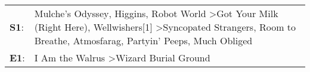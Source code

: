 \begin{supertabular}{p{0.03\textwidth}p{0.92\textwidth}}
 \textbf{S1}:  &  Mulche's Odyssey\textsuperscript{}, \enspace Higgins\textsuperscript{}, \enspace Robot World\textsuperscript{} \textgreater \enspace Got Your Milk (Right Here)\textsuperscript{}, \enspace Wellwishers[1]\textsuperscript{} \textgreater \enspace Syncopated Strangers\textsuperscript{}, \enspace Room to Breathe\textsuperscript{}, \enspace Atmosfarag\textsuperscript{}, \enspace Partyin' Peeps\textsuperscript{}, \enspace Much Obliged\textsuperscript{}  \enspace  \\
 \textbf{E1}:  &                                                                                                                                                                                                                                                                                                                                                                    I Am the Walrus\textsuperscript{} \textgreater \enspace Wizard Burial Ground\textsuperscript{}  \enspace  \\
\end{supertabular}

